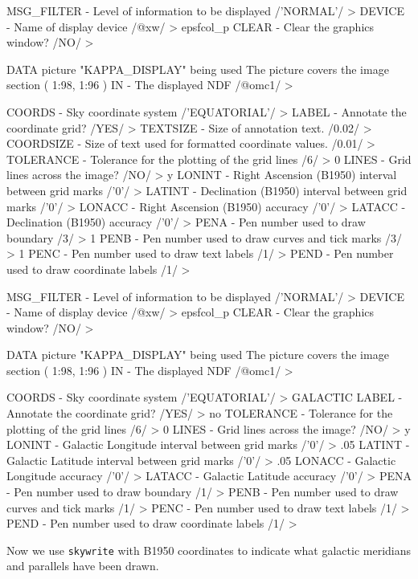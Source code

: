 \documentclass[11pt,noabs]{starlink}
\begin{document}
\begin{terminalv}
MSG_FILTER - Level of information to be displayed /'NORMAL'/ >
DEVICE - Name of display device /@xw/ > epsfcol_p
CLEAR - Clear the graphics window? /NO/ >

 DATA picture "KAPPA_DISPLAY" being used
 The picture covers the image section ( 1:98, 1:96 )
IN - The displayed NDF /@omc1/ >

COORDS - Sky coordinate system /'EQUATORIAL'/ >
LABEL - Annotate the coordinate grid? /YES/ >
TEXTSIZE - Size of annotation text. /0.02/ >
COORDSIZE - Size of text used for formatted coordinate values. /0.01/ >
TOLERANCE - Tolerance for the plotting of the grid lines /6/ > 0
LINES - Grid lines across the image? /NO/ > y
LONINT - Right Ascension (B1950) interval between grid marks /'0'/ >
LATINT - Declination (B1950) interval between grid marks /'0'/ >
LONACC - Right Ascension (B1950) accuracy /'0'/ >
LATACC - Declination (B1950) accuracy /'0'/ >
PENA - Pen number used to draw boundary /3/ > 1
PENB - Pen number used to draw curves and tick marks /3/ > 1
PENC - Pen number used to draw text labels /1/ >
PEND - Pen number used to draw coordinate labels /1/ >

MSG_FILTER - Level of information to be displayed /'NORMAL'/ >
DEVICE - Name of display device /@xw/ > epsfcol_p
CLEAR - Clear the graphics window? /NO/ >

 DATA picture "KAPPA_DISPLAY" being used
 The picture covers the image section ( 1:98, 1:96 )
IN - The displayed NDF /@omc1/ >

COORDS - Sky coordinate system /'EQUATORIAL'/ > GALACTIC
LABEL - Annotate the coordinate grid? /YES/ > no
TOLERANCE - Tolerance for the plotting of the grid lines /6/ > 0
LINES - Grid lines across the image? /NO/ > y
LONINT - Galactic Longitude interval between grid marks /'0'/ > .05
LATINT - Galactic Latitude interval between grid marks /'0'/ > .05
LONACC - Galactic Longitude accuracy /'0'/ >
LATACC - Galactic Latitude accuracy /'0'/ >
PENA - Pen number used to draw boundary /1/ >
PENB - Pen number used to draw curves and tick marks /1/ >
PENC - Pen number used to draw text labels /1/ >
PEND - Pen number used to draw coordinate labels /1/ >
\end{terminalv}

   Now we use \texttt{skywrite} with B1950 coordinates to indicate what
   galactic meridians and parallels have been drawn.
\end{document}
